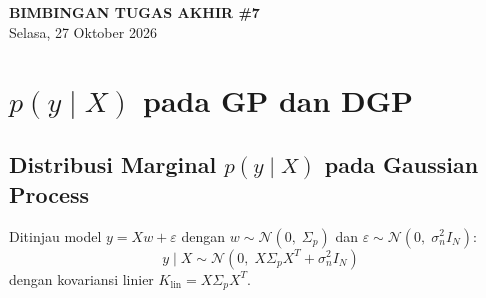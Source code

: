 \documentclass[11pt,a4paper]{article}
\def\boldsymbol#1{#1}%
\def\mathbf#1{#1}%
\theoremstyle{plain}
\theoremstyle{definition}
\theoremstyle{remark}
\begin{document}
\begin{center}
    {\Large\textbf{BIMBINGAN TUGAS AKHIR \#7}} \\[0.3em]
    {\small Selasa, 27 Oktober 2026}
\end{center}
\vspace{-0.2cm}
\setlength{\abovedisplayskip}{6pt}
\setlength{\belowdisplayskip}{6pt}
\setlength{\abovedisplayshortskip}{4pt}
\setlength{\belowdisplayshortskip}{4pt}

\section{\texorpdfstring{$p(\mathbf{y} \mid X)$}{p(y|X)} pada GP dan DGP}
\label{sec:py_gp_dgp}

\subsection{Distribusi Marginal \texorpdfstring{$p(\mathbf{y} \mid X)$}{p(y|X)} pada Gaussian Process}
\label{subsec:marginal_gp}

\noindent Ditinjau model $\mathbf{y} = X \mathbf{w} + \boldsymbol{\varepsilon}$ dengan $\mathbf{w} \sim \mathcal{N}\left(\mathbf{0}, \; \Sigma_p\right)$ dan $\boldsymbol{\varepsilon} \sim \mathcal{N}\left(\mathbf{0}, \; \sigma_n^2 I_N\right)$:
\begin{equation}
    \mathbf{y} \mid X \sim \mathcal{N}\left(\mathbf{0}, \; X \Sigma_p X^T + \sigma_n^2 I_N\right) \label{eq:marginal_linier}
\end{equation}
dengan kovariansi linier $K_{\text{lin}} = X \Sigma_p X^T$.
\end{document}
